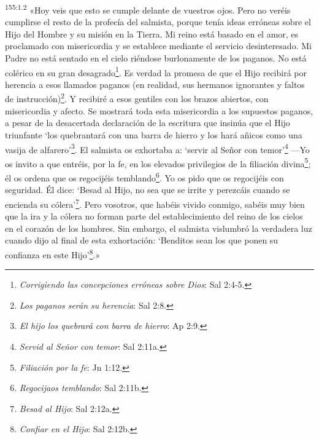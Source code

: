 \par
\textsuperscript{155:1.2} «Hoy veis que esto se cumple delante de vuestros ojos. Pero no veréis cumplirse el resto de la profecía del salmista, porque tenía ideas erróneas sobre el Hijo del Hombre y su misión en la Tierra. Mi reino está basado en el amor, es proclamado con misericordia y se establece mediante el servicio desinteresado. Mi Padre no está sentado en el cielo riéndose burlonamente de los paganos. No está colérico en su gran desagrado\footnote{\textit{Corrigiendo las concepciones erróneas sobre Dios}: Sal 2:4-5.}. Es verdad la promesa de que el Hijo recibirá por herencia a esos llamados paganos (en realidad, sus hermanos ignorantes y faltos de instrucción)\footnote{\textit{Los paganos serán su herencia}: Sal 2:8.}. Y recibiré a esos gentiles con los brazos abiertos, con misericordia y afecto. Se mostrará toda esta misericordia a los supuestos paganos, a pesar de la desacertada declaración de la escritura que insinúa que el Hijo triunfante `los quebrantará con una barra de hierro y los hará añicos como una vasija de alfarero'\footnote{\textit{El hijo los quebrará con barra de hierro}: Ap 2:9.}. El salmista os exhortaba a: `servir al Señor con temor'\footnote{\textit{Servid al Señor con temor}: Sal 2:11a.} ---Yo os invito a que entréis, por la fe, en los elevados privilegios de la filiación divina\footnote{\textit{Filiación por la fe}: Jn 1:12.}; él os ordena que os regocijéis temblando\footnote{\textit{Regocijaos temblando}: Sal 2:11b.}. Yo os pido que os regocijéis con seguridad. Él dice: `Besad al Hijo, no sea que se irrite y perezcáis cuando se encienda su cólera'\footnote{\textit{Besad al Hijo}: Sal 2:12a.}. Pero vosotros, que habéis vivido conmigo, sabéis muy bien que la ira y la cólera no forman parte del establecimiento del reino de los cielos en el corazón de los hombres. Sin embargo, el salmista vislumbró la verdadera luz cuando dijo al final de esta exhortación: `Benditos sean los que ponen su confianza en este Hijo'\footnote{\textit{Confiar en el Hijo}: Sal 2:12b.}.»

